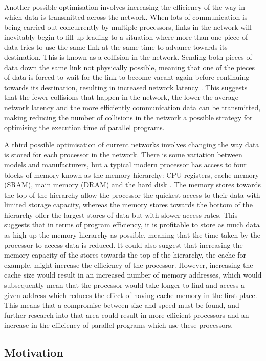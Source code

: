 \documentclass[a4paper, 12pt]{article}
\begin{document}
Another possible optimisation involves increasing the efficiency of the way in which data is transmitted across the network. When lots of communication is being carried out concurrently by multiple processors, links in the network will inevitably begin to fill up leading to a situation where more than one piece of data tries to use the same link at the same time to advance towards its destination. This is known as a collision in the network. Sending both pieces of data down the same link not physically possible, meaning that one of the pieces of data is forced to wait for the link to become vacant again before continuing towards its destination, resulting in increased network latency \cite{Lam04}. This suggests that the fewer collisions that happen in the network, the lower the average network latency and the more efficiently communication data can be transmitted, making reducing the number of collisions in the network a possible strategy for optimising the execution time of parallel programs.

A third possible optimisation of current networks involves changing the way data is stored for each processor in the network. There is some variation between models and manufacturers, but a typical modern processor has access to four blocks of memory known as the memory hierarchy: CPU registers, cache memory (SRAM), main memory (DRAM) and the hard disk \cite{Toy86}. The memory stores towards the top of the hierarchy allow the processor the quickest access to their data with limited storage capacity, whereas the memory stores towards the bottom of the hierarchy offer the largest stores of data but with slower access rates. This suggests that in terms of program efficiency, it is profitable to store as much data as high up the memory hierarchy as possible, meaning that the time taken by the processor to access data is reduced. It could also suggest that increasing the memory capacity of the stores towards the top of the hierarchy, the cache for example, might increase the efficiency of the processor. However, increasing the cache size would result in an increased number of memory addresses, which would subsequently mean that the processor would take longer to find and access a given address which reduces the effect of having cache memory in the first place. This means that a compromise between size and speed must be found, and further research into that area could result in more efficient processors and an increase in the efficiency of parallel programs which use these processors. 

\subsection{Motivation}
\end{document}
